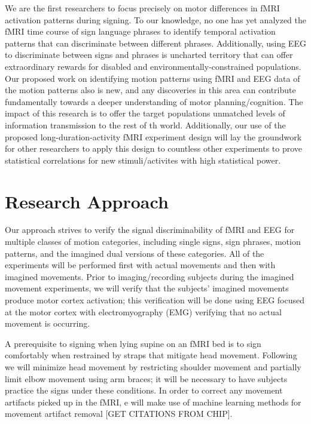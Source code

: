 \documentclass{proposal}
\begin{document}
We are the first researchers to focus precisely on motor differences in fMRI activation patterns during signing. To our knowledge, no one has yet analyzed the fMRI time course of sign language phrases to identify temporal activation patterns that can discriminate between different phrases. Additionally, using EEG to discriminate between signs and phrases is uncharted territory that can offer extraordinary rewards for disabled and environmentally-constrained populations. Our proposed work on identifying motion patterns using fMRI and EEG data of the motion patterns also is new, and any discoveries in this area can contribute fundamentally towards a deeper understanding of motor planning/cognition. The impact of this research is to offer the target populations unmatched levels of information transmission to the rest of th world. Additionally, our use of the proposed long-duration-activity fMRI experiment design will lay the groundwork for other researchers to apply this design to countless other experiments to prove statistical correlations for new stimuli/activites with high statistical power.


\section{Research Approach}

Our approach strives to verify the signal discriminability of fMRI and EEG for multiple classes of motion categories, including single signs, sign phrases, motion patterns, and the imagined dual versions of these categories. All of the experiments will be performed first with actual movements and then with imagined movements. Prior to imaging/recording subjects during the imagined movement experiments, we will verify that the subjects' imagined movements produce motor cortex activation; this verification will be done using EEG focused at the motor cortex with electromyography (EMG) verifying that no actual movement is occurring.

A prerequisite to signing when lying supine on an fMRI bed is to sign comfortably when restrained by straps that mitigate head movement. Following \cite[]{culham2003vgg} we will minimize head movement by restricting shoulder movement and partially limit elbow movement using arm braces; it will be necessary to have subjects practice the signs under these conditions. In order to correct any movement artifacts picked up in the fMRI, e will make use of machine learning methods for movement artifact removal [GET CITATIONS FROM CHIP].
\end{document}
